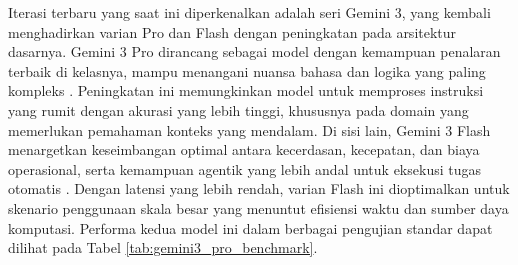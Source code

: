 Iterasi terbaru yang saat ini diperkenalkan adalah seri Gemini 3, yang kembali menghadirkan varian Pro dan Flash dengan peningkatan pada arsitektur dasarnya. Gemini 3 Pro dirancang sebagai model dengan kemampuan penalaran terbaik di kelasnya, mampu menangani nuansa bahasa dan logika yang paling kompleks \parencite{google2025}. Peningkatan ini memungkinkan model untuk memproses instruksi yang rumit dengan akurasi yang lebih tinggi, khususnya pada domain yang memerlukan pemahaman konteks yang mendalam. Di sisi lain, Gemini 3 Flash menargetkan keseimbangan optimal antara kecerdasan, kecepatan, dan biaya operasional, serta kemampuan agentik yang lebih andal untuk eksekusi tugas otomatis \parencite{googleGemini3Flash2025}. Dengan latensi yang lebih rendah, varian Flash ini dioptimalkan untuk skenario penggunaan skala besar yang menuntut efisiensi waktu dan sumber daya komputasi. Performa kedua model ini dalam berbagai pengujian standar dapat dilihat pada Tabel \ref{tab:gemini3_pro_benchmark}.

